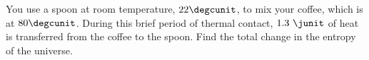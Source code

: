 You use a spoon at room temperature, $22\degcunit$, to mix your coffee, which is at
$80\degcunit$. During this brief period of thermal contact, $1.3\ \junit$ of heat
is transferred from the coffee to the spoon. Find the total change in the entropy
of the universe.\answercheck
